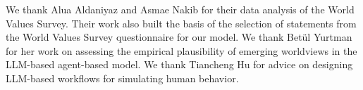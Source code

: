 \documentclass[]{ceurart}
\begin{document}
We thank Alua Aldaniyaz and Asmae Nakib for their data analysis of the
World Values Survey. Their work also built the basis of the selection of
statements from the World Values Survey questionnaire for our model. We
thank Betül Yurtman for her work on assessing the empirical plausibility
of emerging worldviews in the LLM-based agent-based model. We thank
Tiancheng Hu for advice on designing LLM-based workflows for simulating
human behavior.



\end{document}
